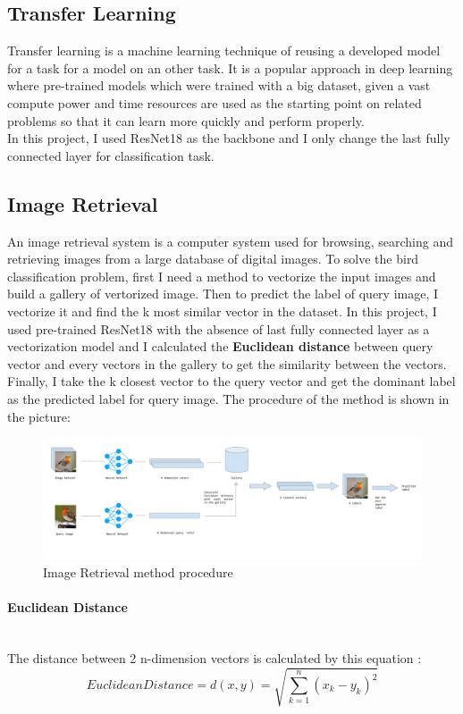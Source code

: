 \documentclass[runningheads]{llncs}
\begin{document}
\subsection{Transfer Learning}
Transfer learning is a machine learning technique of reusing a developed model for a task for a model on an other task. It is a popular approach in deep learning where pre-trained models which were trained with a big dataset, given a vast compute power and time resources are used as the starting point on related problems so that it can learn more quickly and perform properly.\\
In this project, I used ResNet18 as the backbone and I only change the last fully connected layer for classification task.

\subsection{Image Retrieval}
An image retrieval system is a computer system used for browsing, searching and retrieving images from a large database of digital images.\cite{ir} To solve the bird classification problem, first I need a method to vectorize the input images and build a gallery of vertorized image. Then to predict the label of query image, I vectorize it and find the k most similar vector in the dataset. In this project, I used pre-trained ResNet18 with the absence of last fully connected layer as a vectorization model and I calculated the \textbf{Euclidean distance} between query vector and every vectors in the gallery to get the similarity between the vectors. Finally, I take the k closest vector to the query vector and get the dominant label as the predicted label for query image. The procedure of the method is shown in the picture: 
\begin{figure}
    \centering
    \includegraphics[width=\textwidth]{Figures/Image retrieval.png}
    \caption{Image Retrieval method procedure}
    \label{fig:image retri}
\end{figure}

\paragraph{\large\bf Euclidean Distance}\hspace*{\fill} \\
The distance between 2 n-dimension vectors is calculated by this equation :
\begin{equation}
Euclidean Distance = d(x, y) =\sqrt{\sum_{k=1}^{n}\left(x_{k}-y_{k}\right)^{2}}
\end{equation}
\end{document}
